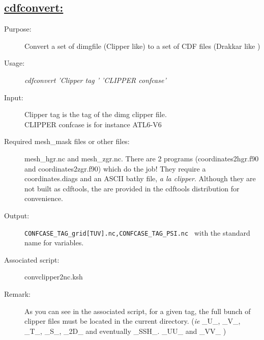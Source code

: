 \documentclass[a4paper,11pt]{article}
\begin{document}
\subsection*{\underline{cdfconvert:}}
\begin{description}
\item[Purpose:]  Convert a set of dimgfile (Clipper like)
                 to a set of CDF files (Drakkar like )
\item[Usage:] {\em cdfconvert 'Clipper tag ' 'CLIPPER confcase'}
\item[Input:] Clipper tag is the tag of the dimg clipper file. \\
               CLIPPER confcase is for instance ATL6-V6
\item[Required mesh\_mask files or other files:] mesh\_hgr.nc and mesh\_zgr.nc. There are 2 programs 
    (coordinates2hgr.f90 and coordinates2zgr.f90) which do the job! They require a coordinates.diags and an ASCII bathy file, {\it a la clipper}. Although
  they are not built as cdftools, the are provided in the cdftools distribution for convenience.
\item[Output:] {\tt CONFCASE\_TAG\_grid[TUV].nc,CONFCASE\_TAG\_PSI.nc } with the standard name for variables.
\item[Associated script:] convclipper2nc.ksh
\item[Remark:] As you can see in the associated script, for a given tag, the full bunch of clipper files must be located
               in the current directory. ({\it ie} \_U\_, \_V\_, \_T\_, \_S\_, \_2D\_ and eventually \_SSH\_. \_UU\_ and \_VV\_ )
\end{description}

\newpage
\end{document}
